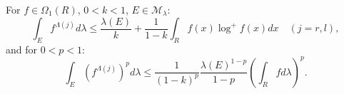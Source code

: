 For $f \in \Omega_1(R)$, $0 < k < 1$, $E \in \mathcal{M}_\lambda$:
$$\int_E f^{\Lambda(j)} d\lambda \leq \frac{\lambda(E)}{k} + \frac{1}{1-k} \int_R f(x) \log^+ f(x) dx \quad (j=r,l),$$
and for $0 < p < 1$:
$$\int_E (f^{\Lambda(j)})^p d\lambda \leq \frac{1}{(1-k)^p} \frac{\lambda(E)^{1-p}}{1-p} \left(\int_R f d\lambda\right)^p.$$

